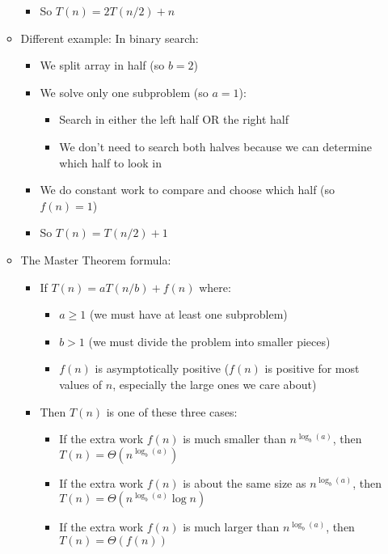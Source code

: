\documentclass[11pt,a4paper]{article}
\begin{document}
\begin{multicols}{2}
\begin{itemize}
\begin{itemize}
\begin{itemize}
            \item So $T(n) = 2T(n/2) + n$
        \end{itemize}
        \item Different example: In binary search:
        \begin{itemize}
            \item We split array in half (so $b = 2$)
            \item We solve only one subproblem (so $a = 1$):
            \begin{itemize}
                \item Search in either the left half OR the right half
                \item We don't need to search both halves because we can determine which half to look in
            \end{itemize}
            \item We do constant work to compare and choose which half (so $f(n) = 1$)
            \item So $T(n) = T(n/2) + 1$
        \end{itemize}
        \item The Master Theorem formula:
        \begin{itemize}
            \item If $T(n) = aT(n/b) + f(n)$ where:
            \begin{itemize}
                \item $a \geq 1$ (we must have at least one subproblem)
                \item $b > 1$ (we must divide the problem into smaller pieces)
                \item $f(n)$ is asymptotically positive ($f(n)$ is positive for most values of $n$, especially the large ones we care about)
            \end{itemize}
            \item Then $T(n)$ is one of these three cases:
            \begin{itemize}
                \item If the extra work $f(n)$ is much smaller than $n^{\log_b(a)}$, then $T(n) = \Theta(n^{\log_b(a)})$
                \item If the extra work $f(n)$ is about the same size as $n^{\log_b(a)}$, then $T(n) = \Theta(n^{\log_b(a)} \log n)$
                \item If the extra work $f(n)$ is much larger than $n^{\log_b(a)}$, then $T(n) = \Theta(f(n))$
            \end{itemize}
        \end{itemize}
    \end{itemize}
\end{itemize}


\end{multicols}
\end{document}
